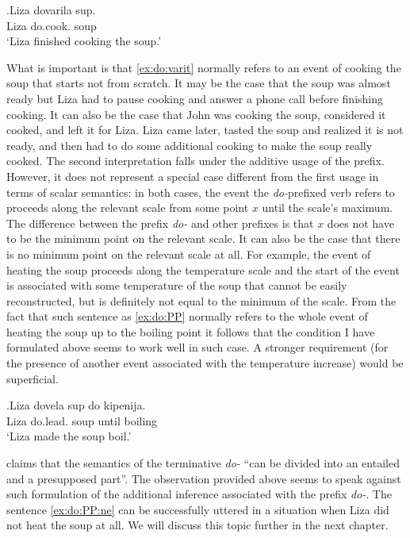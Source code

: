 \exg.\label{ex:do:varit}Liza dovarila sup.\\
Liza do.cook. soup\\
\vspace{0.5em}
`Liza finished cooking the soup.'

What is important is that \ref{ex:do:varit} normally refers to an event of cooking the soup that starts not from scratch. It may be the case that the soup was almost ready but Liza had to pause cooking and answer a phone call before finishing cooking. It can also be the case that John was cooking the soup, considered it cooked, and left it for Liza. Liza came later, tasted the soup and realized it is not ready, and then had to do some additional cooking to make the soup really cooked. The second interpretation falls under the additive usage of the prefix. However, it does not represent a special case different from the first usage in terms of scalar semantics: in both cases, the event the \textit{do-}prefixed verb refers to proceeds along the relevant scale from some point $x$ until the scale's maximum. The difference between the prefix \textit{do-} and other prefixes is that $x$ does not have to be the minimum point on the relevant scale. It can also be the case that there is no minimum point on the relevant scale at all. For example, the event of heating the soup proceeds along the temperature scale and the start of the event is associated with some temperature of the soup that cannot be easily reconstructed, but is definitely not equal to the minimum of the scale. From the fact that such sentence as \ref{ex:do:PP} normally refers to the whole event of heating the soup up to the boiling point it follows that the condition I have formulated above seems to work well in such case. A stronger requirement (for the presence of another event associated with the temperature increase) would be superficial.

\exg.\label{ex:do:PP}Liza dovela sup do kipenija.\\
Liza do.lead. soup until boiling\\
\vspace{0.5em}
`Liza made the soup boil.'

\citet[75]{Kagan:book} claims that the semantics of the terminative \textit{do-} ``can be divided into an entailed and a presupposed part''. The observation provided above seems to speak against such formulation of the additional inference associated with the prefix \textit{do-}. The sentence \ref{ex:do:PP:ne} can be successfully uttered in a situation when Liza did not heat the soup at all. We will discuss this topic further in the next chapter.

